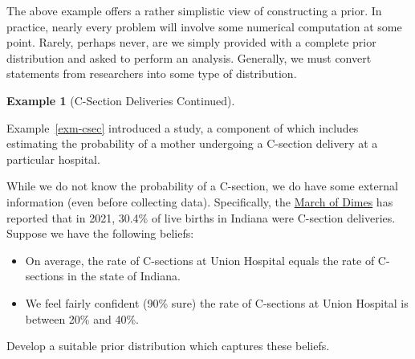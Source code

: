 \documentclass[
  letterpaper,
  DIV=11,
  numbers=noendperiod]{scrreprt}
\providecommand{\tightlist}{%
  \setlength{\itemsep}{0pt}\setlength{\parskip}{0pt}}\usepackage{longtable,booktabs,array}
\theoremstyle{definition}
\theoremstyle{plain}
\theoremstyle{definition}
\newtheorem{example}{Example}[chapter]
\theoremstyle{remark}
\begin{document}
The above example offers a rather simplistic view of constructing a
prior. In practice, nearly every problem will involve some numerical
computation at some point. Rarely, perhaps never, are we simply provided
with a complete prior distribution and asked to perform an analysis.
Generally, we must convert statements from researchers into some type of
distribution.

\begin{example}[C-Section Deliveries
Continued]\protect\hypertarget{exm-csec-prior}{}\label{exm-csec-prior}

Example~\ref{exm-csec} introduced a study, a component of which includes
estimating the probability of a mother undergoing a C-section delivery
at a particular hospital.

While we do not know the probability of a C-section, we do have some
external information (even before collecting data). Specifically, the
\href{https://www.marchofdimes.org/peristats/data?reg=99\&top=8\&stop=87\&lev=1\&slev=4\&obj=18\&sreg=18}{March
of Dimes} has reported that in 2021, 30.4\% of live births in Indiana
were C-section deliveries. Suppose we have the following beliefs:

\begin{itemize}
\tightlist
\item
  On average, the rate of C-sections at Union Hospital equals the rate
  of C-sections in the state of Indiana.
\item
  We feel fairly confident (90\% sure) the rate of C-sections at Union
  Hospital is between 20\% and 40\%.
\end{itemize}

Develop a suitable prior distribution which captures these beliefs.

\end{example}
\end{document}

